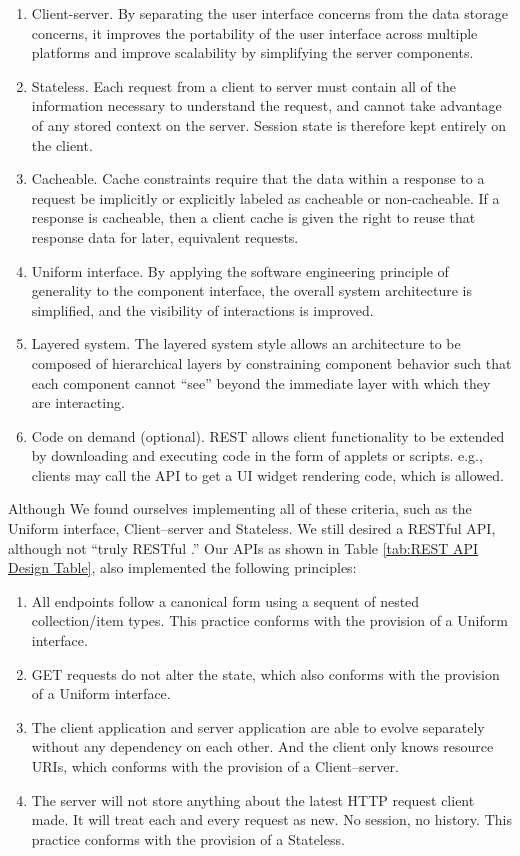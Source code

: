 \begin{enumerate}
  \item Client-server. By separating the user interface concerns from the data storage concerns, it improves the portability of the user interface across multiple platforms and improve scalability by simplifying the server components.
  \item Stateless. Each request from a client to server must contain all of the information necessary to understand the request, and cannot take advantage of any stored context on the server. Session state is therefore kept entirely on the client.
  \item Cacheable. Cache constraints require that the data within a response to a request be implicitly or explicitly labeled as cacheable or non-cacheable. If a response is cacheable, then a client cache is given the right to reuse that response data for later, equivalent requests.
  \item Uniform interface. By applying the software engineering principle of generality to the component interface, the overall system architecture is simplified, and the visibility of interactions is improved.
  \item Layered system. The layered system style allows an architecture to be composed of hierarchical layers by constraining component behavior such that each component cannot ``see'' beyond the immediate layer with which they are interacting.
  \item Code on demand (optional). REST allows client functionality to be extended by downloading and executing code in the form of applets or scripts. e.g., clients may call the API to get a UI widget rendering code, which is allowed.
\end{enumerate}

Although We found ourselves implementing all of these criteria, such as the Uniform interface, Client–server and Stateless. We still desired a RESTful API, although not “truly RESTful \cite{web:RESTArchitecturalConstraints}.” Our APIs as shown in Table \ref{tab:REST API Design Table}, also implemented the following principles:

\begin{enumerate}
  \item All endpoints follow a canonical form using a sequent of nested collection/item types. This practice conforms with the provision of a Uniform interface.
  \item GET requests do not alter the state, which also conforms with the provision of a Uniform interface.
  \item The client application and server application are able to evolve separately without any dependency on each other. And the client only knows resource URIs, which conforms with the provision of a Client–server.
  \item The server will not store anything about the latest HTTP request client made. It will treat each and every request as new. No session, no history. This practice conforms with the provision of a Stateless.
\end{enumerate}

